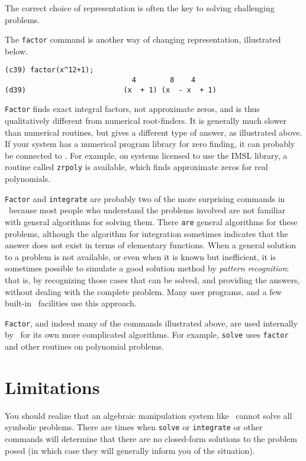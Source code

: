 The correct choice of representation is often the key to solving
challenging problems.

The {\tt factor} command is another way of changing representation,
illustrated below.
\begin{verbatim}
(c39) factor(x^12+1);
                              4        8    4
(d39)                       (x  + 1) (x  - x  + 1)
\end{verbatim}

{\tt Factor} finds exact integral factors, not approximate zeros, and is
thus qualitatively different from numerical root-finders.  It is generally
much slower than numerical routines, but gives a different type of answer, as
illustrated above.  If your system has a numerical program library for
zero finding, it can probably be connected to \Max.  For example,
on systems licensed to use the IMSL library, a routine called {\tt zrpoly}
is available, which finds approximate zeros for real polynomials. 

{\tt Factor} and {\tt integrate} are probably two of the more surprising
commands in \Max\
because most people who understand the problems involved
are not familiar with general algorithms for solving them.
There {\tt are} general algorithms for these problems, although the
algorithm for integration sometimes indicates that the answer does
not exist in terms of elementary functions.
When a general solution to a problem is not available, or even when
it is known but inefficient, it is
sometimes possible to simulate a good
solution method by {\it pattern recognition}: that is,
by recognizing those cases that can be solved, and providing the answers,
without dealing with the complete problem.  Many user programs, and
a few built-in \Max\ facilities use this approach.

{\tt Factor}, and indeed many of the commands illustrated above, are used
internally by \Max\ for its own more complicated algorithms.  For example, 
{\tt solve} uses {\tt factor} and other routines on polynomial problems.

\section{Limitations}

You should realize that an algebraic manipulation system like \Max\ cannot 
solve all symbolic problems. There are times when {\tt solve} or 
{\tt integrate} or other commands will determine that
there are no closed-form solutions to the problem posed (in which case
they will generally inform you of the situation).

